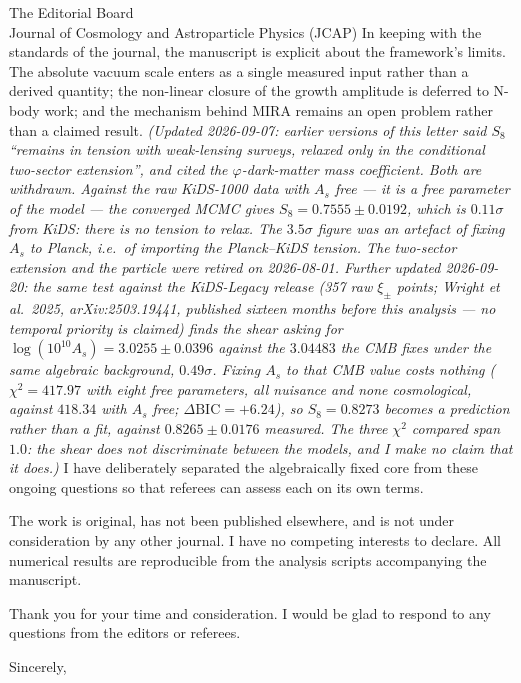 \documentclass[11pt]{letter}
\begin{document}
\begin{letter}{The Editorial Board\\Journal of Cosmology and Astroparticle Physics (JCAP)}
In keeping with the standards of the journal, the manuscript is explicit about
the framework's limits. The absolute vacuum scale enters as a single measured
input rather than a derived quantity; the non-linear closure of the growth
amplitude is deferred to N-body work; and the mechanism behind MIRA remains
an open problem rather than a claimed result. \emph{(Updated 2026-09-07:
earlier versions of this letter said $S_8$ ``remains in tension with
weak-lensing surveys, relaxed only in the conditional two-sector extension'',
and cited the $\varphi$-dark-matter mass coefficient. Both are withdrawn.
Against the raw KiDS-1000 data with $A_s$ free --- it is a free parameter of
the model --- the converged MCMC gives $S_8=0.7555\pm0.0192$, which is
$0.11\sigma$ from KiDS: there is no tension to relax. The $3.5\sigma$ figure
was an artefact of fixing $A_s$ to Planck, i.e.\ of importing the
Planck--KiDS tension. The two-sector extension and the particle were retired
on 2026-08-01. \emph{Further updated 2026-09-20:} the same test against the
KiDS-Legacy release (357 raw $\xi_\pm$ points; Wright et al.\ 2025,
arXiv:2503.19441, published sixteen months before this analysis --- no
temporal priority is claimed) finds the shear asking for
$\log(10^{10}A_s)=3.0255\pm0.0396$ against the $3.04483$ the CMB fixes under
the same algebraic background, $0.49\sigma$. Fixing $A_s$ to that CMB value
costs nothing ($\chi^2=417.97$ with eight free parameters, all nuisance and
none cosmological, against $418.34$ with $A_s$ free; $\Delta\mathrm{BIC}=+6.24$),
so $S_8=0.8273$ becomes a prediction rather than a fit, against
$0.8265\pm0.0176$ measured. The three $\chi^2$ compared span $1.0$: the shear
does not discriminate between the models, and I make no claim that it
does.)} I have deliberately separated the algebraically fixed core from these
ongoing questions so that referees can assess each on its own terms.

The work is original, has not been published elsewhere, and is not under
consideration by any other journal. I have no competing interests to declare.
All numerical results are reproducible from the analysis scripts accompanying
the manuscript.

Thank you for your time and consideration. I would be glad to respond to any
questions from the editors or referees.

\closing{Sincerely,}

\end{letter}
\end{document}

